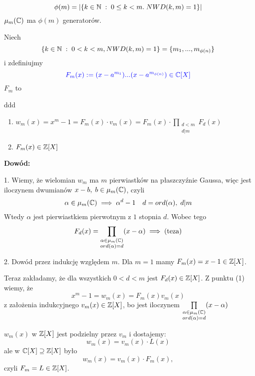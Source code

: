 $$\phi(m)=|\{k\in\mathbb{N}\;:\;0\leq k<m.\;NWD(k,m)=1\}|$$
$\mu_m(\mathbb{C})$ ma $\phi(m)$ generatorów.

Niech
$$\{k\in\mathbb{N}\;:\;0<k<m, NWD(k, m)=1\}=\{m_1,...,m_{\phi(n)}\}$$
i zdefiniujmy
$$\color{blue}F_m(x):=(x-a^{m_1})...(x-a^{m_{\phi(n)}})\in\mathbb{C}[X]$$
$F_m$ to 

\begin{uwaga}[$F_m\in\Z\begin{bmatrix}X\end{bmatrix}$]{\color{back}ddd}
    \begin{enumerate}
        \item $w_m(x)=x^m-1=F_m(x)\cdot v_m(x)=F_m(x)\cdot\prod\limits_{\substack{d<m\\d|m}}F_d(x)$
        \item $F_m(x)\in\mathbb{Z}[X]$
    \end{enumerate}
\end{uwaga}

\textbf{Dowód:}
 
1. Wiemy, że wielomian $w_m$ ma $m$ pierwiastków na płaszczyźnie Gaussa, więc jest iloczynem dwumianów $x-b,\;b\in\mu_m(\mathbb{C})$, czyli
\begin{align*}
    \alpha\in\mu_m(\mathbb{C})\implies\alpha^d-1\quad d=ord(\alpha),\;d|m
\end{align*}
Wtedy $\alpha$ jest pierwiastkiem pierwotnym z $1$ stopnia $d$. Wobec tego
$$F_d(x)=\prod\limits_{\substack{\alpha\in\mu_m(\mathbb{C})\\ord(\alpha)=d}}(x-\alpha)\implies (\text{teza})$$

2. Dowód przez indukcję względem $m$. Dla $m=1$ mamy $F_m(x)=x-1\in\mathbb{Z}[X]$. 

Teraz zakładamy, że dla wszystkich $0<d<m$ jest $F_d(x)\in\mathbb{Z}[X]$. Z punktu (1) wiemy, że
$$x^m-1=w_m(x)=F_m(x)v_m(x)$$
z założenia indukcyjnego $v_m(x)\in\mathbb{Z}[X]$, bo jest iloczynem $\prod\limits_{\substack{\alpha\in\mu_m(\mathbb{C})\\ord(\alpha)=d}}(x-\alpha)$

$w_m(x)$ w $\mathbb{Z}[X]$ jest podzielny przez $v_m$ i dostajemy:
$$w_m(x)=v_m(x)\cdot L(x)$$
ale w $\mathbb{C}[X]\supseteq\mathbb{Z}[X]$ było
$$w_m(x)=v_m(x)\cdot F_m(x),$$
czyli $F_m=L\in\mathbb{Z}[X]$.

